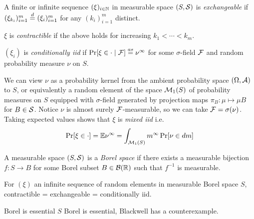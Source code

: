 
\begin{definition}
  A finite or infinite sequence $(\xi)_{i \in \mathbb{N}}$ in measurable space
  $(S, \mathcal{S})$ is \emph{exchangeable} if
  $(\xi_{k_i})_{i=1}^m \overset{d}{=} (\xi_i)_{i=1}^m$ for any $(k_i)_{i=1}^m$ distinct.

  $\xi$ is \emph{contractible} if the above holds for increasing $k_1 < \cdots < k_m$.
\end{definition}

\begin{definition}
  $(\xi_i)$ is \emph{conditionally iid} if
  $\Pr[\xi \in \cdot \mid \mathcal{F}] \overset{as}{=} \nu^\infty$
  for some $\sigma$-field $\mathcal{F}$ and random probability measure $\nu$ on $S$.
\end{definition}
We can view $\nu$ as a probability kernel from the ambient probability space
$(\Omega, \mathcal{A})$ to $S$, or equivalently a random element of the space $\mathcal{M}_1(S)$
of probability measures on $S$ equipped with $\sigma$-field generated by
projection maps $\pi_B : \mu \mapsto \mu B$ for $B \in \mathcal{S}$.
Notice $\nu$ is almost surely $\mathcal{F}$-measurable,
so we can take $\mathcal{F} = \sigma(\nu)$. Taking expected values shows that $\xi$
is \emph{mixed iid} i.e.
\[
  \Pr[\xi \in \cdot]
  = \mathbb{E} \nu^\infty
  = \int_{\mathcal{M}_1(S)} m^\infty \Pr[\nu \in dm]
\]

\begin{definition}
  A measurable space $(S, \mathcal{S})$ is a \emph{Borel space} if
  there exists a measurable bijection $f : S \to B$ for some Borel subset
  $B \in \mathcal{B}(\mathbb{R})$ such that $f^{-1}$ is measurable.
\end{definition}

\begin{theorem}
  For $(\xi)$ an infinite sequence of random elements in
  measurable Borel space $S$,
  contractible = exchangeable = conditionally iid.
\end{theorem}

\begin{note}{Borel is essential}
  $S$ Borel is essential, Blackwell has a counterexample.
\end{note}


